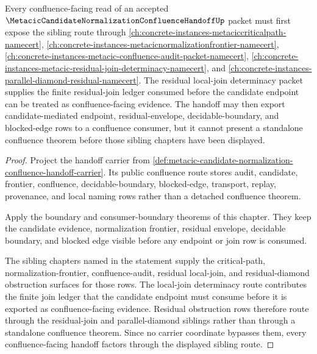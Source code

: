 \begin{theorem}
\label{thm:metacic-candidate-normalization-confluence-handoff-sibling-route}
Every confluence-facing read of an accepted $\MetacicCandidateNormalizationConfluenceHandoffUp$ packet must first expose the sibling route through \autoref{ch:concrete-instances-metaciccriticalpath-namecert}, \autoref{ch:concrete-instances-metacicnormalizationfrontier-namecert}, \autoref{ch:concrete-instances-metacic-confluence-audit-packet-namecert}, \autoref{ch:concrete-instances-metacic-residual-join-determinacy-namecert}, and \autoref{ch:concrete-instances-parallel-diamond-residual-namecert}. The residual local-join determinacy packet supplies the finite residual-join ledger consumed before the candidate endpoint can be treated as confluence-facing evidence. The handoff may then export candidate-mediated endpoint, residual-envelope, decidable-boundary, and blocked-edge rows to a confluence consumer, but it cannot present a standalone confluence theorem before those sibling chapters have been displayed.
\end{theorem}
\begin{proof}
Project the handoff carrier from \autoref{def:metacic-candidate-normalization-confluence-handoff-carrier}. Its public confluence route stores audit, candidate, frontier, confluence, decidable-boundary, blocked-edge, transport, replay, provenance, and local naming rows rather than a detached confluence theorem.

Apply the boundary and consumer-boundary theorems of this chapter. They keep the candidate evidence, normalization frontier, residual envelope, decidable boundary, and blocked edge visible before any endpoint or join row is consumed.

The sibling chapters named in the statement supply the critical-path, normalization-frontier, confluence-audit, residual local-join, and residual-diamond obstruction surfaces for those rows. The local-join determinacy route contributes the finite join ledger that the candidate endpoint must consume before it is exported as confluence-facing evidence. Residual obstruction rows therefore route through the residual-join and parallel-diamond siblings rather than through a standalone confluence theorem. Since no carrier coordinate bypasses them, every confluence-facing handoff factors through the displayed sibling route.
\end{proof}
